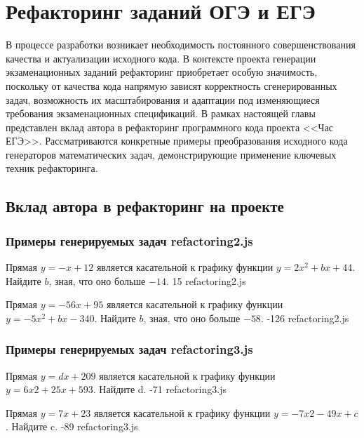 \section{Рефакторинг заданий ОГЭ и ЕГЭ}\label{4sect}
В процессе разработки возникает необходимость постоянного совершенствования качества и актуализации исходного кода. В контексте проекта генерации экзаменационных заданий рефакторинг приобретает особую значимость, поскольку от качества кода напрямую зависят корректность сгенерированных задач, возможность их масштабирования и адаптации под изменяющиеся требования экзаменационных спецификаций.
В рамках настоящей главы представлен вклад автора в рефакторинг программного кода проекта <<Час ЕГЭ>>. Рассматриваются конкретные примеры преобразования исходного кода генераторов математических задач, демонстрирующие применение ключевых техник рефакторинга.

\subsection{Вклад автора в рефакторинг на проекте}


\subsubsection*{Примеры генерируемых задач refactoring2.js}
 
\par{Прямая $y=-x+12$ является касательной к графику функции $y=2x^{2}+bx+44$. Найдите $b$, зная, что оно больше $−14$. }{ 15 }{refactoring2.js}
\par{Прямая $y=−56x+95$ является касательной к графику функции $y=-5x^{2}+bx-340$. Найдите $b$, зная, что оно больше $−58$. }{ -126 }{refactoring2.js}


\subsubsection*{Примеры генерируемых задач refactoring3.js}
 
\par{Прямая $y=dx+209$ является касательной к графику функции $y=6x{2}+25x+593$. Найдите d. }{ -71 }{refactoring3.js}
\par{Прямая $y=7x+23$ является касательной к графику функции $y=−7x{2}−49x+c$. Найдите c. }{ -89 }{refactoring3.js}

